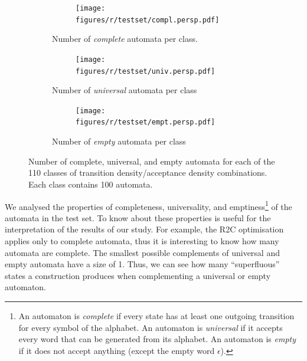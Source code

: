 \renewcommand{\tabcolsep}{0.05cm}   %
\renewcommand{\arraystretch}{1.05}
\begin{figure}[htb!]
  \centering
  \begin{subfigure}{\textwidth}
    \begin{subtable}{0.47\textwidth}
    
    \end{subtable}
    \hfill
    \begin{subfigure}{0.52\textwidth}
    \texttt{[image: figures/r/testset/compl.persp.pdf]}
    \end{subfigure}
  \caption{Number of \textit{complete} automata per class.}
  \end{subfigure}

 \begin{subfigure}{\textwidth}
    \begin{subtable}{0.47\textwidth}
    
    \end{subtable}
    \hfill
    \begin{subfigure}{0.52\textwidth}
    \texttt{[image: figures/r/testset/univ.persp.pdf]}
    \end{subfigure}
  \caption{Number of \textit{universal} automata per class}
  \end{subfigure}

  \begin{subfigure}{\textwidth}
    \begin{subtable}{0.47\textwidth}
    
    \end{subtable}
    \hfill
    \begin{subfigure}{0.52\textwidth}
    \texttt{[image: figures/r/testset/empt.persp.pdf]}
    \end{subfigure}
  \caption{Number of \textit{empty} automata per class}
  \end{subfigure}
\caption{Number of complete, universal, and empty automata for each of the 110 classes of transition density/acceptance density combinations. Each class contains 100 automata.}
\label{testset_analysis}
\end{figure}
\tablestyle  %

We analysed the properties of completeness, universality, and emptiness\footnote{An automaton is \textit{complete} if every state has at least one outgoing transition for every symbol of the alphabet. An automaton is \textit{universal} if it accepts every word that can be generated from its alphabet. An automaton is \textit{empty} if it does not accept anything (except the empty word $\epsilon$).} of the automata in the \goal{} test set. To know about these properties is useful for the interpretation of the results of our study. For example, the R2C optimisation applies only to complete automata, thus it is interesting to know how many automata are complete. The smallest possible complements of universal and empty automata have a size of 1. Thus, we can see how many ``superfluous'' states a construction produces when complementing a universal or empty automaton.

